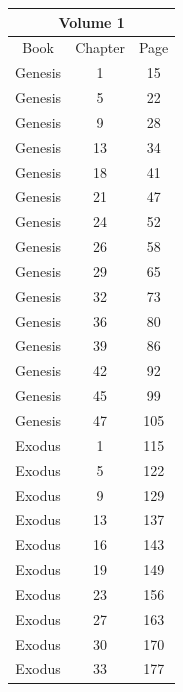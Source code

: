 \documentclass{article}
\newlength{\minipageheight}
\newlength{\minipagewidth}
\begin{document}
\begin{minipage}[l][\minipageheight][t]{\minipagewidth}%
    \begin{center}
        \renewcommand{\arraystretch}{1.0}
        \begin{tabular}{|c|c|c|}
            \hline
            \multicolumn{3}{|c|}{Volume 1} \\
            \hline
            Book      & Chapter & Page     \\
            \hline
            Genesis   & 1       & 15       \\
            Genesis   & 5       & 22       \\
            Genesis   & 9       & 28       \\
            Genesis   & 13      & 34       \\
            Genesis   & 18      & 41       \\
            Genesis   & 21      & 47       \\
            Genesis   & 24      & 52       \\
            Genesis   & 26      & 58       \\
            Genesis   & 29      & 65       \\
            Genesis   & 32      & 73       \\
            Genesis   & 36      & 80       \\
            Genesis   & 39      & 86       \\
            Genesis   & 42      & 92       \\
            Genesis   & 45      & 99       \\
            Genesis   & 47      & 105      \\
            Exodus    & 1       & 115      \\
            Exodus    & 5       & 122      \\
            Exodus    & 9       & 129      \\
            Exodus    & 13      & 137      \\
            Exodus    & 16      & 143      \\
            Exodus    & 19      & 149      \\
            Exodus    & 23      & 156      \\
            Exodus    & 27      & 163      \\
            Exodus    & 30      & 170      \\
            Exodus    & 33      & 177      \\

\end{tabular}
\end{center}
\end{minipage}
\end{document}
